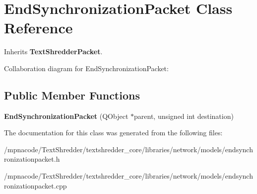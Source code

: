 \section{EndSynchronizationPacket Class Reference}
\label{class_end_synchronization_packet}


Inherits {\bf TextShredderPacket}.



Collaboration diagram for EndSynchronizationPacket:
\subsection*{Public Member Functions}
\begin{DoxyCompactItemize}
\item 
{\bfseries EndSynchronizationPacket} (QObject $\ast$parent, unsigned int destination)\label{class_end_synchronization_packet_af3dbce191c055643d5cae8a4cccf3565}

\end{DoxyCompactItemize}


The documentation for this class was generated from the following files:\begin{DoxyCompactItemize}
\item 
/mpnacode/TextShredder/textshredder\_\-core/libraries/network/models/endsynchronizationpacket.h\item 
/mpnacode/TextShredder/textshredder\_\-core/libraries/network/models/endsynchronizationpacket.cpp\end{DoxyCompactItemize}
